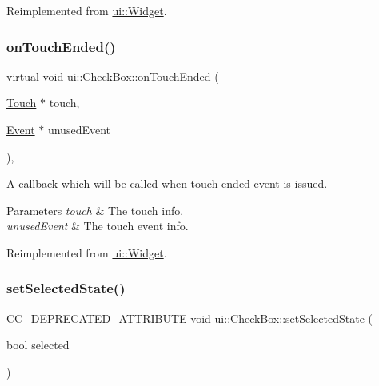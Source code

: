 Reimplemented from \hyperlink{classui_1_1Widget_ac4d1576dfe1f3cf0a509f2d2ca0c5b90}{ui\+::\+Widget}.

\mbox{\label{classui_1_1CheckBox_a52c24b8aef0e2ea66f5220f49a95f510}} 
\subsubsection{\texorpdfstring{on\+Touch\+Ended()}{onTouchEnded()}\hspace{0.1cm}{\footnotesize\ttfamily [2/2]}}
{\footnotesize\ttfamily virtual void ui\+::\+Check\+Box\+::on\+Touch\+Ended (\begin{DoxyParamCaption}\item[{\hyperlink{classTouch}{Touch} $\ast$}]{touch,  }\item[{\hyperlink{classEvent}{Event} $\ast$}]{unused\+Event }\end{DoxyParamCaption})\hspace{0.3cm}{\ttfamily [override]}, {\ttfamily [virtual]}}

A callback which will be called when touch ended event is issued. 
\begin{DoxyParams}{Parameters}
{\em touch} & The touch info. \\
\hline
{\em unused\+Event} & The touch event info. \\
\hline
\end{DoxyParams}


Reimplemented from \hyperlink{classui_1_1Widget_ac4d1576dfe1f3cf0a509f2d2ca0c5b90}{ui\+::\+Widget}.

\mbox{\label{classui_1_1CheckBox_a44e1b53dcbc7ac25e41b72e2e4487775}} 
\subsubsection{\texorpdfstring{set\+Selected\+State()}{setSelectedState()}\hspace{0.1cm}{\footnotesize\ttfamily [1/2]}}
{\footnotesize\ttfamily C\+C\+\_\+\+D\+E\+P\+R\+E\+C\+A\+T\+E\+D\+\_\+\+A\+T\+T\+R\+I\+B\+U\+TE void ui\+::\+Check\+Box\+::set\+Selected\+State (\begin{DoxyParamCaption}\item[{bool}]{selected }\end{DoxyParamCaption})\hspace{0.3cm}{\ttfamily [inline]}}

